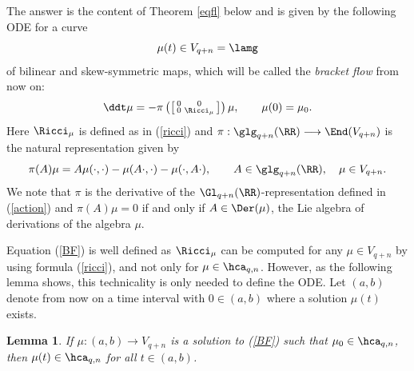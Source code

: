 \documentclass[11pt]{amsart}
\theoremstyle{plain}
\newtheorem{lemma}[theorem]{Lemma}
\theoremstyle{definition}
\theoremstyle{remark}
\begin{document}
The answer is the content of Theorem \ref{eqfl} below and is given by the following ODE for a curve
$$
\mu(t)\in V_{q+n}=\lamg
$$
of bilinear and skew-symmetric maps, which will be called the {\it bracket flow} from now on:
\begin{equation}\label{BF}
\ddt\mu=-\pi\left(\left[\begin{smallmatrix} 0&0\\ 0&\Ricci_{\mu}
\end{smallmatrix}\right]\right)\mu, \qquad\mu(0)=\mu_0.
\end{equation}
Here $\Ricci_{\mu}$ is defined as in (\ref{ricci}) and $\pi:\glg_{q+n}(\RR)\longrightarrow\End(V_{q+n})$ is the natural representation given by
\begin{equation}\label{actiong}
\pi(A)\mu=A\mu(\cdot,\cdot)-\mu(A\cdot,\cdot)-\mu(\cdot,A\cdot),
\qquad A\in\glg_{q+n}(\RR),\quad\mu\in V_{q+n}.
\end{equation}
We note that $\pi$ is the derivative of the $\Gl_{q+n}(\RR)$-representation defined in (\ref{action}) and $\pi(A)\mu=0$ if and only if $A\in\Der(\mu)$, the Lie algebra of
derivations of the algebra $\mu$.

Equation (\ref{BF}) is well defined as $\Ricci_\mu$ can be computed for any $\mu\in V_{q+n}$ by using formula (\ref{ricci}), and not only for $\mu\in\hca_{q,n}$.    However, as the following lemma shows, this technicality is only needed to define the ODE.  Let $(a,b)$ denote from now on a time interval with $0\in (a,b)$ where a solution $\mu(t)$ exists.

\begin{lemma}\label{muflow}
If $\mu:(a,b)\longrightarrow V_{q+n}$ is a solution to {\rm (\ref{BF})} such that $\mu_0\in\hca_{q,n}$, then $\mu(t)\in\hca_{q,n}$ for all $t\in (a,b)$.
\end{lemma}
\end{document}
